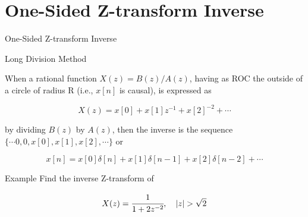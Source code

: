 \documentclass[aspectratio=169,xcolor=dvipsnames,svgnames,x11names,fleqn]{beamer}
\begin{document}
\section{One-Sided Z-transform Inverse}


\begin{frame}{}
    \begin{center}
    \Huge \bf \color{DarkBlue}
    \faFire
    
    One-Sided Z-transform Inverse
\end{center}
\end{frame}

\begin{frame}{Long Division Method}

When a rational function $X(z) = B(z)/A(z)$, having as ROC the outside of a circle of radius R (i.e., $x[n]$ is causal), is
expressed as

$$
X(z) = x[0] + x[1]z^{-1} + x[2]^{-2} + \cdots
$$

by dividing $B(z)$ by $A(z)$, then the inverse is the sequence $\{ \cdots 0, 0, x[0], x[1], x[2], \cdots\}$ or

$$
x[n] = x[0]\delta[n] + x[1]\delta[n-1] + x[2]\delta[n-2] + \cdots 
$$


\end{frame}


\begin{frame}{Example}
    Find the inverse Z-transform of

    $$
X(z) = \cfrac{1}{1 + 2z^{-2}}, \quad |z|  > \sqrt{2}
$$
\end{frame}

\begin{frame}{}
\vspace*{-9\baselineskip}
    \color{LightGray}{Blank space for calculation}
\end{frame}
\begin{frame}{}
\vspace*{-9\baselineskip}
    \color{LightGray}{Blank space for calculation}
\end{frame}
\begin{frame}{}
\vspace*{-9\baselineskip}
    \color{LightGray}{Blank space for calculation}
\end{frame}
\begin{frame}{}
\vspace*{-9\baselineskip}
    \color{LightGray}{Blank space for calculation}
\end{frame}
\end{document}
